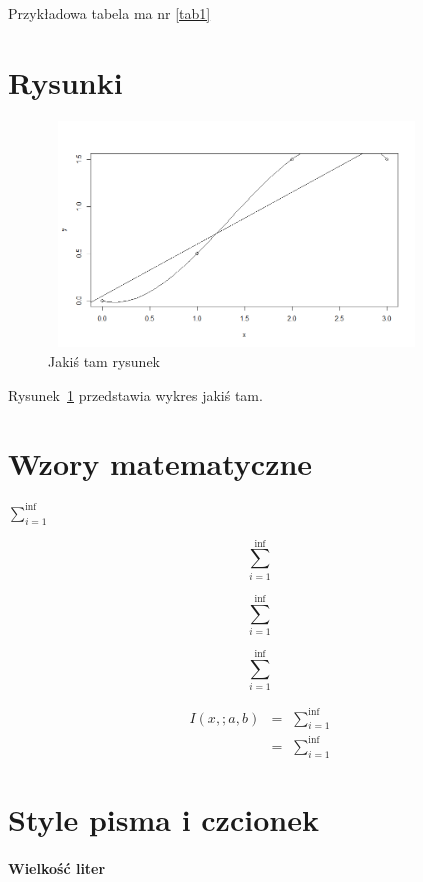 \documentclass[12pt]{article}\usepackage[]{graphicx}\usepackage[]{color}
\begin{document}
Przykładowa tabela ma nr \ref{tab1}

\section{Rysunki}

\begin{figure}[ht]
\includegraphics[width=10cm,height=6cm]{Rplot.png}
\caption{Jakiś tam rysunek}\label{rys1}
\end{figure}

Rysunek~\ref{rys1} przedstawia wykres jakiś tam.

\section{Wzory matematyczne}

$\sum_{i=1}^{\inf}$

$$\sum_{i=1}^{\inf}$$

\begin{equation}
\sum_{i=1}^{\inf}
\end{equation}

\begin{equation*}
\sum_{i=1}^{\inf}
\end{equation*}

\begin{eqnarray*}
I(x,;a,b)&=&\sum_{i=1}^{\inf}\\&=&\sum_{i=1}^{\inf}
\end{eqnarray*}

\section{Style pisma i czcionek}

\paragraph{Wielkość liter}
\end{document}
